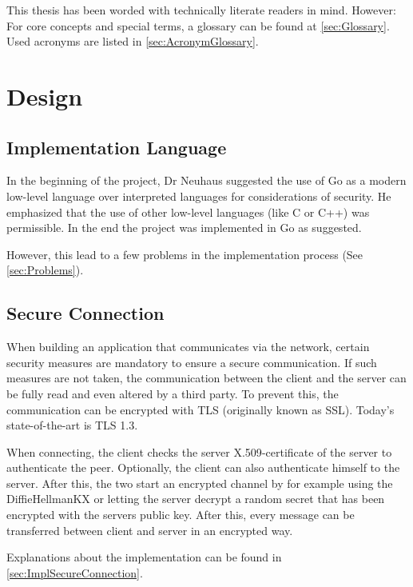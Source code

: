 \documentclass[10pt,a4paper,titlepage,twoside,english,final]{zhawreprt}
\begin{document}
\vspace{1.5cm}
This thesis has been worded with technically literate readers in mind.
However: For core concepts and special terms, a glossary can be found at \ref{sec:Glossary}.
Used acronyms are listed in \ref{sec:AcronymGlossary}.

\chapter{Design}\label{chp:Design}
\section{Implementation Language}\label{sec:DesignImplementationLanguage}
In the beginning of the project, Dr Neuhaus suggested the use of \gls{Go} as a modern low-level language over interpreted languages for considerations of security.
He emphasized that the use of other low-level languages (like \gls{C} or \gls{C++}) was permissible.
In the end the project was implemented in \gls{Go} as suggested.

However, this lead to a few problems in the implementation process (See \ref{sec:Problems}).

\section{Secure Connection}\label{sec:DesignSecureConnection}
When building an application that communicates via the network, certain security measures are mandatory to ensure a secure communication.
If such measures are not taken, the communication between the client and the server can be fully read and even altered by a third party.
To prevent this, the communication can be encrypted with \gls{TLS} (originally known as \gls{SSL}).
Today's state-of-the-art is \gls{TLS} 1.3\citep{rfc8446}.

When connecting, the client checks the server \gls{X.509}-certificate of the server to authenticate the peer.
Optionally, the client can also authenticate himself to the server.
After this, the two start an encrypted channel by for example using the \gls{DiffieHellmanKX} or letting the server decrypt a random secret that has been encrypted with the servers public key.
After this, every message can be transferred between client and server in an encrypted way.

Explanations about the implementation can be found in \ref{sec:ImplSecureConnection}.
\end{document}
